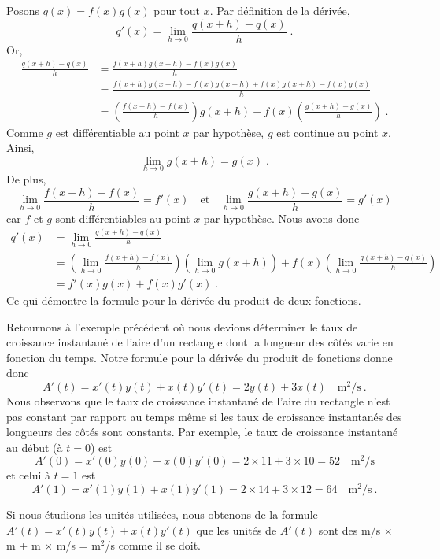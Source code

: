 {Posons $q(x) = f(x) g(x)$ pour tout $x$.  Par définition de la
dérivée,
\[
q'(x) = \lim_{h\rightarrow 0} \frac{q(x+h)-q(x)}{h} \; .
\]
Or,
\begin{align*}
\frac{q(x+h)-q(x)}{h} &= \frac{f(x+h)g(x+h) - f(x)g(x)}{h} \\
&= \frac{f(x+h)g(x+h) - f(x)g(x+h) + f(x)g(x+h) - f(x)g(x)}{h} \\
&= \left(\frac{f(x+h) - f(x)}{h}\right) g(x+h)
+f(x) \left( \frac{g(x+h) - g(x)}{h} \right) \; .
\end{align*}
Comme $g$ est différentiable au point $x$ par hypothèse, $g$ est
continue au point $x$.  Ainsi,
\[
\lim_{h\rightarrow 0} g(x+h) = g(x) \;.
\]
De plus,
\[
\lim_{h\rightarrow 0} \frac{f(x+h) - f(x)}{h} = f'(x)
\quad \text{et} \quad
\lim_{h\rightarrow 0} \frac{g(x+h) - g(x)}{h} = g'(x)
\]
car $f$ et $g$ sont différentiables au point $x$ par hypothèse.  Nous avons
donc
\begin{align*}
q'(x) &= \lim_{h\rightarrow 0} \frac{q(x+h)-q(x)}{h} \\
&= \left( \lim_{h\rightarrow 0} \frac{f(x+h) - f(x)}{h} \right)
\left( \lim_{h\rightarrow 0} g(x+h) \right)
+ f(x) \left( \lim_{h\rightarrow 0} \frac{g(x+h) - g(x)}{h} \right) \\
&=f'(x) g(x) + f(x) g'(x) \; .
\end{align*}
Ce qui démontre la formule pour la dérivée du produit de deux
fonctions.

\begin{egg}
Retournons à l'exemple précédent où nous devions déterminer le taux de
croissance instantané de l'aire d'un rectangle dont la longueur des
côtés varie en fonction du temps.  Notre formule pour la dérivée du
produit de fonctions donne donc
\[
A'(t) = x'(t) y(t) + x(t) y'(t) = 2 y(t) + 3 x(t) \quad \text{m$^2$/s} \ .
\]
Nous observons que le taux de croissance instantané de l'aire du rectangle
n'est pas constant par rapport au temps même si les taux de croissance
instantanés des longueurs des côtés sont constants.  Par exemple, le
taux de croissance instantané au début (à $t=0$) est
\[
A'(0) = x'(0) y(0) + x(0) y'(0) = 2 \times 11 + 3 \times 10
= 52 \quad \text{m$^2$/s}
\]
et celui à $t=1$ est
\[
A'(1) = x'(1) y(1) + x(1) y'(1) = 2 \times 14 + 3 \times 12
= 64 \quad \text{m$^2$/s} \ .
\]

Si nous étudions les unités utilisées, nous obtenons de la formule
$A'(t) = x'(t) y(t) + x(t) y'(t)$ que les unités de $A'(t)$ sont des
m/s $\times$ m + m $\times$ m/s = m$^2$/s comme il se doit.
\end{egg}

}
